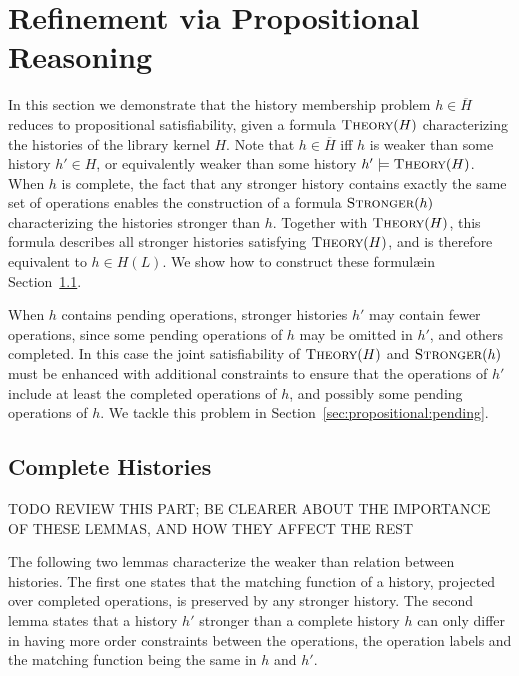 
\section{Refinement via Propositional Reasoning}
\label{sec:propositional}

In this section we demonstrate that the history membership problem $h \in
\overline{H}$ reduces to propositional satisfiability, given a formula
$\textsc{Theory}(H)$ characterizing the histories of the library kernel $H$.
Note that $h \in \overline{H}$ if{f} $h$ is weaker than some history $h' \in
H$, or equivalently weaker than some history $h' |= \textsc{Theory}(H)$. When
$h$ is complete, the fact that any stronger history contains exactly the same
set of operations enables the construction of a formula $\textsc{Stronger}(h)$
characterizing the histories stronger than $h$. Together with
$\textsc{Theory}(H)$, this formula describes all stronger histories satisfying
$\textsc{Theory}(H)$, and is therefore equivalent to $h \in H(L)$. We show how
to construct these formul\ae in Section~\ref{sec:propositional:complete}.

When $h$ contains pending operations, stronger histories $h'$ may contain fewer
operations, since some pending operations of $h$ may be omitted in $h'$, and
others completed. In this case the joint satisfiability of $\textsc{Theory}(H)$
and $\textsc{Stronger}(h)$ must be enhanced with additional constraints to
ensure that the operations of $h'$ include at least the completed operations of
$h$, and possibly some pending operations of $h$. We tackle this problem in
Section~\ref{sec:propositional:pending}.

\subsection{Complete Histories}
\label{sec:propositional:complete}

TODO REVIEW THIS PART; BE CLEARER ABOUT THE IMPORTANCE OF THESE LEMMAS, AND
HOW THEY AFFECT THE REST

The following two lemmas characterize the weaker than relation between
histories. The first one states that the matching function of a history,
projected over completed operations, is preserved by any stronger history. The
second lemma states that a history $h'$ stronger than a complete history $h$
can only differ in having more order constraints between the operations, the
operation labels and the matching function being the same in $h$ and $h'$.

